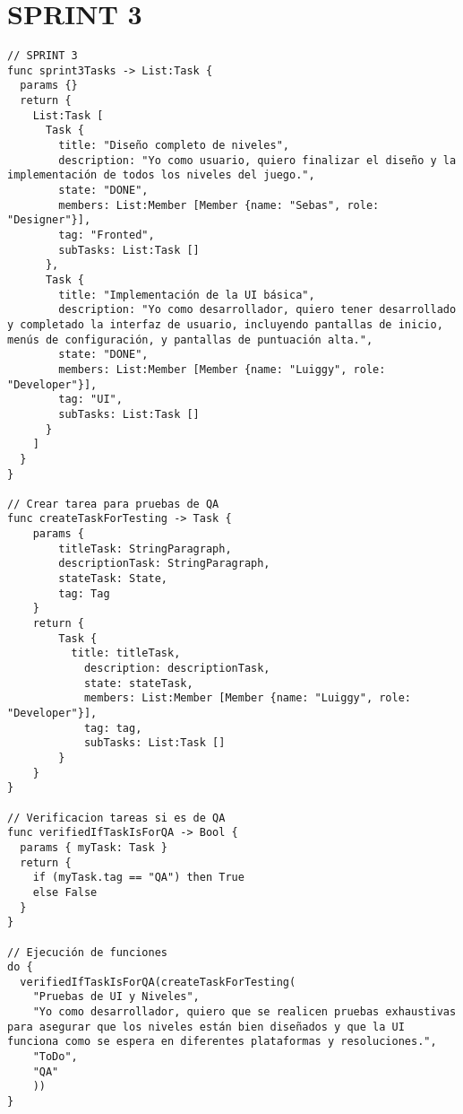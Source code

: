 \documentclass{article}
\begin{document}
\section{SPRINT 3}
\begin{verbatim}
// SPRINT 3
func sprint3Tasks -> List:Task {
  params {}
  return {
    List:Task [
      Task {
        title: "Diseño completo de niveles",
        description: "Yo como usuario, quiero finalizar el diseño y la implementación de todos los niveles del juego.",
        state: "DONE",
        members: List:Member [Member {name: "Sebas", role: "Designer"}],
        tag: "Fronted",
        subTasks: List:Task []
      },
      Task {
        title: "Implementación de la UI básica",
        description: "Yo como desarrollador, quiero tener desarrollado y completado la interfaz de usuario, incluyendo pantallas de inicio, menús de configuración, y pantallas de puntuación alta.",
        state: "DONE",
        members: List:Member [Member {name: "Luiggy", role: "Developer"}],
        tag: "UI",
        subTasks: List:Task []
      }
    ]
  }
}

// Crear tarea para pruebas de QA
func createTaskForTesting -> Task {
    params {
        titleTask: StringParagraph,
        descriptionTask: StringParagraph,
        stateTask: State,
        tag: Tag
    }
    return {
        Task {
          title: titleTask,
	        description: descriptionTask,
	        state: stateTask,
	        members: List:Member [Member {name: "Luiggy", role: "Developer"}],
	        tag: tag,
	        subTasks: List:Task []
        }
    }
}

// Verificacion tareas si es de QA 
func verifiedIfTaskIsForQA -> Bool {
  params { myTask: Task }
  return {
    if (myTask.tag == "QA") then True
    else False
  }
}

// Ejecución de funciones 
do {
  verifiedIfTaskIsForQA(createTaskForTesting(
    "Pruebas de UI y Niveles", 
    "Yo como desarrollador, quiero que se realicen pruebas exhaustivas para asegurar que los niveles están bien diseñados y que la UI funciona como se espera en diferentes plataformas y resoluciones.", 
    "ToDo", 
    "QA"
    ))
}
\end{verbatim}
\end{document}

